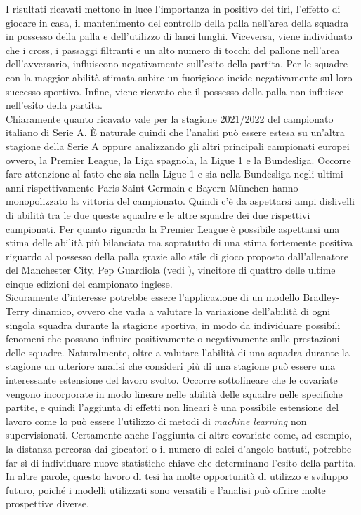 I risultati ricavati mettono in luce l'importanza in positivo dei tiri, l'effetto di giocare in casa, il mantenimento del controllo della palla nell'area della squadra in possesso della palla e dell'utilizzo di lanci lunghi. Viceversa, viene individuato che i cross, i passaggi filtranti e un alto numero di tocchi del pallone nell'area dell’avversario, influiscono negativamente sull'esito della partita. Per le squadre con la maggior abilità stimata subire un fuorigioco incide negativamente sul loro successo sportivo. Infine, viene ricavato che il possesso della palla non influisce nell'esito della partita.\\
Chiaramente quanto ricavato vale per la stagione 2021/2022 del campionato italiano di Serie A. È naturale quindi che l'analisi può essere estesa su un’altra stagione della Serie A oppure analizzando gli altri principali campionati europei ovvero, la Premier League, la Liga spagnola, la Ligue 1 e la Bundesliga. Occorre fare attenzione al fatto che sia nella Ligue 1 e sia nella Bundesliga negli ultimi anni rispettivamente Paris Saint Germain e Bayern München hanno monopolizzato la vittoria del campionato. Quindi c'è da aspettarsi ampi dislivelli di abilità tra le due queste squadre e le altre squadre dei due rispettivi campionati. Per quanto riguarda la Premier League è possibile aspettarsi una stima delle abilità più bilanciata ma sopratutto di una stima fortemente positiva riguardo al possesso della palla grazie allo stile di gioco proposto dall'allenatore del Manchester City, Pep Guardiola (vedi \textit{\cite{futbol}}), vincitore di quattro delle ultime cinque edizioni del campionato inglese.\\
Sicuramente d'interesse potrebbe essere l'applicazione di un modello Bradley-Terry dinamico, ovvero che vada a valutare la variazione dell'abilità di ogni singola squadra durante la stagione sportiva, in modo da individuare possibili fenomeni che possano influire positivamente o negativamente sulle prestazioni delle squadre. Naturalmente, oltre a valutare l'abilità di una squadra durante la stagione un ulteriore analisi che consideri più di una stagione può essere una interessante estensione del lavoro svolto. Occorre sottolineare che le covariate vengono incorporate in modo lineare nelle abilità delle squadre nelle specifiche partite, e quindi l'aggiunta di effetti non lineari è una possibile estensione del lavoro come lo può essere l'utilizzo di metodi di \emph{machine learning} non supervisionati. Certamente anche l'aggiunta di altre covariate come, ad esempio, la distanza percorsa dai giocatori o il numero di calci d'angolo battuti, potrebbe far sì di individuare nuove statistiche chiave che determinano l'esito della partita.\\
In altre parole, questo lavoro di tesi ha molte opportunità di utilizzo e sviluppo futuro, poiché i modelli utilizzati sono versatili e l'analisi può offrire molte prospettive diverse.
